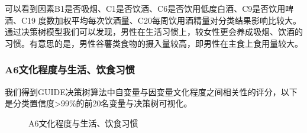 \documentclass{article}
\numberwithin{equation}{subsection}
\begin{document}
可以看到因素B1是否吸烟、C1是否饮酒、C6是否饮用低度白酒、C9是否饮用啤酒、C19 度数加权平均每次饮酒量、C20每周饮用酒精量对分类结果影响比较大。通过决策树模型我们可以发现，男性在生活习惯上，较女性更会养成吸烟、饮酒的习惯。有意思的是，男性谷薯类食物的摄入量较高，即男性在主食上食用量较大。
\subsubsection{A6文化程度与生活、饮食习惯}
我们得到GUIDE决策树算法中自变量与因变量文化程度之间相关性的评分，以下是分类置信度>99\%的前20名变量与决策树可视化。
\begin{figure}[htbp]
    \centering
    \quad
    \caption{A6文化程度与生活、饮食习惯}
\end{figure}
\end{document}
